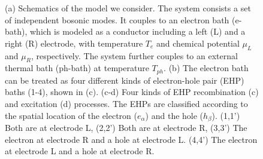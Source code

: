 \documentclass[aps,prb,
,floatfix,footinbib,shortbibliography,
preprint
]{revtex4-1}
\begin{document}
\begin{figure}
	\centering
	\quad
	\quad
	\quad
	\caption{(a) Schematics of the model we consider. The system consists a set of independent bosonic modes. It couples to an electron bath (e-bath), which is modeled as a conductor including a left (L) and a right (R) electrode, with temperature $T_e$ and chemical potential $\mu_L$ and $\mu_R$, respectively. The system further couples to an external thermal bath (ph-bath) at temperature $T_{ph}$. (b) The electron bath can be treated as four different kinds of electron-hole pair (EHP) baths (1-4), shown in (c). (c-d) Four kinds of EHP recombination (c) and excitation (d) processes. The EHPs are classified according to the spatial location of the electron ($e_\alpha$) and the hole ($h_\beta$). (1,1') Both are at electrode L, (2,2') Both are at electrode R, (3,3') The electron at electrode R and a hole at electrode L. (4,4') The electron at electrode L and a hole at electrode R.}
	\label{fig:ehp}
\end{figure}
\end{document}
